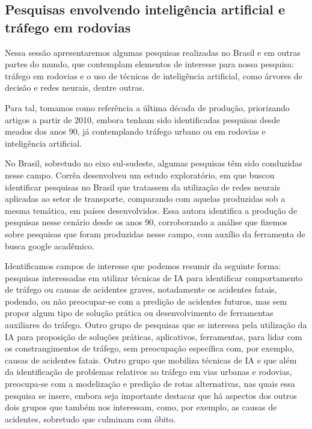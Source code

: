\subsection{Pesquisas envolvendo inteligência artificial e tráfego em rodovias}

Nessa sessão apresentaremos algumas pesquisas realizadas no Brasil e em outras partes do mundo, que contemplam elementos de interesse para nossa pesquisa: tráfego em rodovias e o uso de técnicas de inteligência artificial, como árvores de decisão e redes neurais, dentre outras.

Para tal, tomamos como referência a última década de produção, priorizando artigos a partir de 2010, embora tenham sido identificadas pesquisas desde meados dos anos 90, já contemplando tráfego urbano ou em rodovias e inteligência artificial.

No Brasil, sobretudo no eixo sul-sudeste, algumas pesquisas têm sido conduzidas nesse campo. Corrêa \cite{correa2008aplicaccao} desenvolveu um estudo exploratório, em que buscou identificar pesquisas no Brasil que tratassem da utilização de redes neurais aplicadas ao setor de transporte, comparando com aquelas produzidas sob a mesma temática, em países desenvolvidos. Essa autora identifica a produção de pesquisas nesse cenário desde os anos 90, corroborando a análise que fizemos sobre pesquisas que foram produzidas nesse campo, com auxílio da ferramenta de busca google acadêmico.

Identificamos campos de interesse que podemos resumir da seguinte forma: pesquisas interessadas em utilizar técnicas de IA para identificar comportamento de tráfego ou causas de acidentes graves, notadamente os acidentes fatais, podendo, ou não preocupar-se com a predição de acidentes futuros, mas sem propor algum tipo de solução prática ou desenvolvimento de ferramentas auxiliares do tráfego. Outro grupo de pesquisas que se interessa pela utilização da IA para proposição de soluções práticas, aplicativos, ferramentas, para lidar com os constrangimentos de tráfego, sem preocupação específica com, por exemplo, causas de acidentes fatais. Outro grupo que mobiliza técnicas de IA e que além da identificação de problemas relativos ao tráfego em vias urbanas e rodovias, preocupa-se com a modelização e predição de rotas alternativas, nas quais essa pesquisa se insere, embora seja importante destacar que há aspectos dos outros dois grupos que também nos interessam, como, por exemplo, as causas de acidentes, sobretudo que culminam com óbito. 

